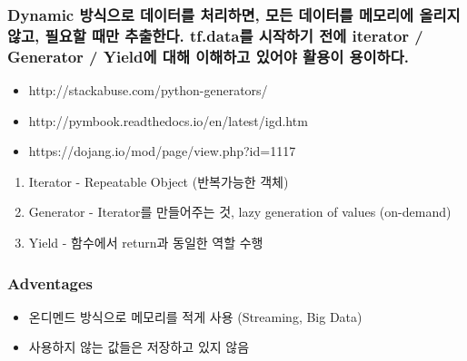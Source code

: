 \documentclass[11pt]{article}
\begin{document}
\hypertarget{dynamic-uxbc29uxc2dduxc73cuxb85c-uxb370uxc774uxd130uxb97c-uxcc98uxb9acuxd558uxba74-uxbaa8uxb4e0-uxb370uxc774uxd130uxb97c-uxba54uxbaa8uxb9acuxc5d0-uxc62cuxb9acuxc9c0-uxc54auxace0-uxd544uxc694uxd560-uxb54cuxb9cc-uxcd94uxcd9cuxd55cuxb2e4.-tf.datauxb97c-uxc2dcuxc791uxd558uxae30-uxc804uxc5d0-iterator-generator-yielduxc5d0-uxb300uxd574-uxc774uxd574uxd558uxace0-uxc788uxc5b4uxc57c-uxd65cuxc6a9uxc774-uxc6a9uxc774uxd558uxb2e4.}{%
\subsubsection{Dynamic 방식으로 데이터를 처리하면, 모든 데이터를
메모리에 올리지 않고, 필요할 때만 추출한다. tf.data를 시작하기 전에
iterator / Generator / Yield에 대해 이해하고 있어야 활용이
용이하다.}\label{dynamic-uxbc29uxc2dduxc73cuxb85c-uxb370uxc774uxd130uxb97c-uxcc98uxb9acuxd558uxba74-uxbaa8uxb4e0-uxb370uxc774uxd130uxb97c-uxba54uxbaa8uxb9acuxc5d0-uxc62cuxb9acuxc9c0-uxc54auxace0-uxd544uxc694uxd560-uxb54cuxb9cc-uxcd94uxcd9cuxd55cuxb2e4.-tf.datauxb97c-uxc2dcuxc791uxd558uxae30-uxc804uxc5d0-iterator-generator-yielduxc5d0-uxb300uxd574-uxc774uxd574uxd558uxace0-uxc788uxc5b4uxc57c-uxd65cuxc6a9uxc774-uxc6a9uxc774uxd558uxb2e4.}}

\begin{itemize}
\item
  http://stackabuse.com/python-generators/
\item
  http://pymbook.readthedocs.io/en/latest/igd.htm
\item
  https://dojang.io/mod/page/view.php?id=1117
\end{itemize}

\begin{enumerate}
\def\labelenumi{\arabic{enumi}.}
\item
  Iterator - Repeatable Object (반복가능한 객체)
\item
  Generator - Iterator를 만들어주는 것, lazy generation of values
  (on-demand)
\item
  Yield - 함수에서 return과 동일한 역할 수행
\end{enumerate}

\hypertarget{adventages}{%
\subsubsection{Adventages}\label{adventages}}

\begin{itemize}
\item
  온디멘드 방식으로 메모리를 적게 사용 (Streaming, Big Data)
\item
  사용하지 않는 값들은 저장하고 있지 않음
\end{itemize}
\end{document}
